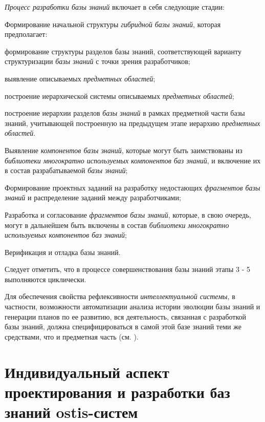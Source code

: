 \textit{Процесс разработки базы знаний} включает в себя следующие стадии:
\begin{textitemize}
	\item Формирование начальной структуры \textit{гибридной базы знаний}, которая предполагает:
		\begin{textitemize}
			\item  формирование структуры разделов базы знаний, соответствующей варианту структуризации \textit{базы знаний} с точки зрения разработчиков;
			\item выявление описываемых \textit{предметных областей};
			\item построение иерархической системы описываемых \textit{предметных областей};
			\item построение иерархии разделов \textit{базы знаний} в рамках предметной	части базы знаний, учитывающей построенную на предыдущем этапе иерархию \textit{предметных областей}.
		\end{textitemize}
	\item Выявление \textit{компонентов базы знаний}, которые могут быть заимствованы из \textit{библиотеки многократно используемых компонентов баз знаний}, и включение их в состав разрабатываемой \textit{базы знаний};
	\item Формирование проектных заданий на разработку недостающих \textit{фрагментов базы знаний} и распределение заданий между разработчиками;
	\item Разработка и согласование \textit{фрагментов базы знаний}, которые, в свою	очередь, могут в дальнейшем быть включены в состав \textit{библиотеки многократно используемых компонентов баз знаний};
	\item Верификация и отладка базы знаний.
\end{textitemize}

Следует отметить, что в процессе совершенствования базы знаний этапы 3 - 5 выполняются циклически.

Для обеспечения свойства рефлексивности \textit{интеллектуальной системы}, в частности, возможности автоматизации анализа истории эволюции базы знаний и генерации планов по ее развитию, вся деятельность, связанная с разработкой базы знаний, должна специфицироваться в самой этой базе знаний теми же средствами, что и предметная часть (см. ).

\section{Индивидуальный аспект проектирования и разработки баз знаний ostis-систем}
\label{sec_kb_design_individual}

